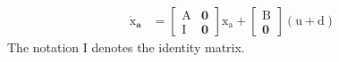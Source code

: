 \documentclass[3p]{elsarticle}
\begin{document}
\begin{equation}\label{systemlqidg}
	\begin{split}
		\boldsymbol{\dot{\mathrm{x}}_a} &= \begin{bmatrix}
			\boldsymbol{\mathrm{A}} & \boldsymbol{0}\\
			\boldsymbol{\mathrm{I}} & \boldsymbol{0}
		\end{bmatrix}\boldsymbol{\mathrm{x_a}} + \begin{bmatrix}
			\boldsymbol{\mathrm{B}}\\
			\boldsymbol{0}
		\end{bmatrix}
		 \left(\boldsymbol{\mathrm{u}} + \boldsymbol{\mathrm{d}}\right)%
	\end{split}
\end{equation}
The notation $\boldsymbol{\mathrm{I}}$ denotes the identity matrix.
\end{document}
